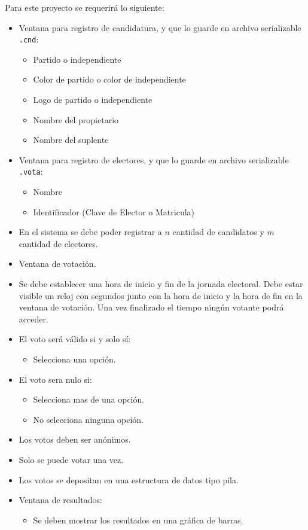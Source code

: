 \documentclass[11pt,a4paper]{article}
\begin{document}
Para este proyecto se requerirá lo siguiente:
\begin{itemize}
\item Ventana para registro de candidatura, y que lo guarde en archivo serializable \texttt{.cnd}:
\begin{itemize}
\item Partido o independiente
\item Color de partido o color de independiente
\item Logo de partido o independiente
\item Nombre del propietario
\item Nombre del suplente
\end{itemize}
\item Ventana para registro de electores, y que lo guarde en archivo serializable \texttt{.vota}:
\begin{itemize}
\item Nombre
\item Identificador (Clave de Elector o Matricula)
\end{itemize}
\item En el sistema se debe poder registrar a $n$ cantidad de candidatos y $m$ cantidad de electores.
\item Ventana de votación.
\item  Se debe establecer una hora de inicio y fin de la jornada electoral. Debe estar visible un reloj con segundos junto con la hora de inicio y la hora de fin en la ventana de votación. Una vez finalizado el tiempo ningún votante podrá acceder.
\item El voto será válido si y solo sí:
\begin{itemize}
\item Selecciona una opción.
\end{itemize}
\item El voto sera nulo si:
\begin{itemize}
\item Selecciona mas de una opción.
\item No selecciona ninguna opción. 
\end{itemize}
\item Los votos deben ser anónimos.
\item Solo se puede votar una vez.
\item Los votos se depositan en una estructura de datos tipo pila.
\item Ventana de resultados:
\begin{itemize}
\item Se deben mostrar los resultados en una gráfica de barras.

\end{itemize}
\end{itemize}
\end{document}
